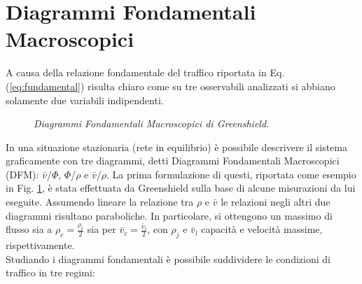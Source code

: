 \documentclass[../main.tex]{subfiles}
\begin{document}
\section{Diagrammi Fondamentali Macroscopici}
A causa della relazione fondamentale del traffico riportata in Eq. (\ref{eq:fundamental}) risulta chiaro come su tre osservabili analizzati si abbiano solamente due variabili indipendenti.
\begin{figure}[H]
\centering
{}
\caption[DFM di Greenshield]{\emph{Diagrammi Fondamentali Macroscopici di Greenshield.}}
\label{fig:greenshield}
\end{figure}
In una situazione stazionaria (rete in equilibrio) \`e possibile descrivere il sistema graficamente con tre diagrammi, detti Diagrammi Fondamentali Macroscopici (DFM): $\bar{v}$/$\Phi$, $\Phi$/$\rho$ e $\bar{v}$/$\rho$.
La prima formulazione di questi, riportata come esempio in Fig. \ref{fig:greenshield}, \`e stata effettuata da Greenshield sulla base di alcune misurazioni da lui eseguite.
Assumendo lineare la relazione tra $\rho$ e $\bar{v}$ le relazioni negli altri due diagrammi risultano paraboliche.
In particolare, si ottengono un massimo di flusso sia a $\rho_c=\frac{\rho_t}{2}$ sia per $\bar{v}_c=\frac{\bar{v}_l}{2}$, con $\rho_j$ e $\bar{v}_l$ capacit\`a e velocit\`a massime, rispettivamente.
\\Studiando i diagrammi fondamentali \`e possibile suddividere le condizioni di traffico in tre regimi:
\end{document}

